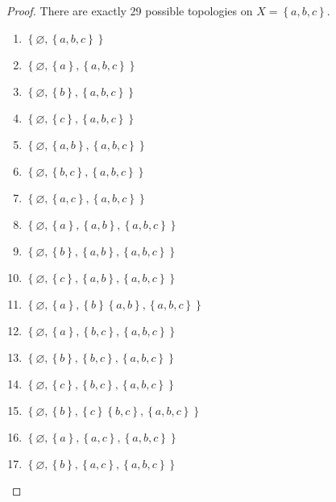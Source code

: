 \begin{proof}
	There are exactly 29 possible topologies on \( X = \left\{ a, b, c \right\} \).
	\begin{enumerate}
		\item \( \left\{ \varnothing, \left\{ a, b, c \right\} \right\} \)
		\item \( \left\{ \varnothing, \left\{ a \right\}, \left\{ a, b, c \right\} \right\} \)
		\item \( \left\{ \varnothing, \left\{ b \right\}, \left\{ a, b, c \right\} \right\} \)
		\item \( \left\{ \varnothing, \left\{ c \right\}, \left\{ a, b, c \right\} \right\} \)
		\item \( \left\{ \varnothing, \left\{ a, b \right\}, \left\{ a, b, c \right\} \right\} \)
		\item \( \left\{ \varnothing, \left\{ b, c \right\}, \left\{ a, b, c \right\} \right\} \)
		\item \( \left\{ \varnothing, \left\{ a, c \right\}, \left\{ a, b, c \right\} \right\} \)
		\item \( \left\{ \varnothing, \left\{ a \right\}, \left\{ a, b \right\}, \left\{ a, b, c \right\} \right\} \)
		\item \( \left\{ \varnothing, \left\{ b \right\}, \left\{ a, b \right\}, \left\{ a, b, c \right\} \right\} \)
		\item \( \left\{ \varnothing, \left\{ c \right\}, \left\{ a, b \right\}, \left\{ a, b, c \right\} \right\} \)
		\item \( \left\{ \varnothing, \left\{ a \right\}, \left\{ b \right\} \left\{ a, b \right\}, \left\{ a, b, c \right\} \right\} \)
		\item \( \left\{ \varnothing, \left\{ a \right\}, \left\{ b, c \right\}, \left\{ a, b, c \right\} \right\} \)
		\item \( \left\{ \varnothing, \left\{ b \right\}, \left\{ b, c \right\}, \left\{ a, b, c \right\} \right\} \)
		\item \( \left\{ \varnothing, \left\{ c \right\}, \left\{ b, c \right\}, \left\{ a, b, c \right\} \right\} \)
		\item \( \left\{ \varnothing, \left\{ b \right\}, \left\{ c \right\} \left\{ b, c \right\}, \left\{ a, b, c \right\} \right\} \)
		\item \( \left\{ \varnothing, \left\{ a \right\}, \left\{ a, c \right\}, \left\{ a, b, c \right\} \right\} \)
		\item \( \left\{ \varnothing, \left\{ b \right\}, \left\{ a, c \right\}, \left\{ a, b, c \right\} \right\} \)

\end{enumerate}
\end{proof}
